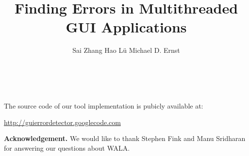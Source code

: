 \documentclass{sig-alternate}
\begin{document}
\title{Finding Errors in Multithreaded GUI Applications}


\author{
\alignauthor Sai Zhang \quad Hao L\"u \quad Michael D. Ernst\\
       \\
       \\
}


\maketitle
















\vspace{1mm}

\noindent The source code of our tool implementation is pubicly available at:


\noindent \url{http://guierrordetector.googlecode.com}


\vspace{2mm}

\noindent \textbf{Acknowledgement.} We would like
to thank Stephen Fink and Manu Sridharan for
answering our questions about WALA.
\vspace{-2mm}


\footnotesize{

}
\end{document}
